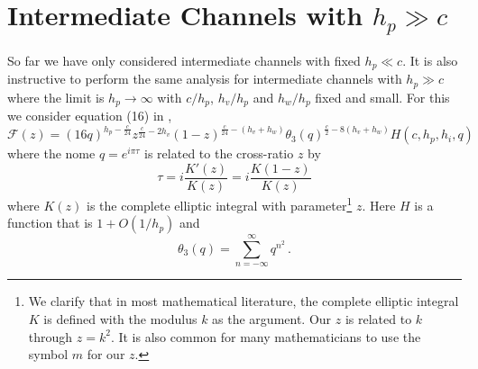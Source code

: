 \documentclass{brownthesis}
\begin{document}
\section{Intermediate Channels with $h_{p}\gg c$}

So far we have only considered intermediate channels with fixed $h_{p}\ll c$.
It is also instructive to perform the same analysis for intermediate
channels with $h_{p}\gg c$ where the limit is $h_{p}\to\infty$ with
$c/h_{p}$, $h_{v}/h_{p}$ and $h_{w}/h_{p}$ fixed and small. For
this we consider equation (16) in \cite{Zam87},
\begin{equation}
\mathcal{F}(z)=\left(16q\right)^{h_{p}-\frac{c}{24}}z^{\frac{c}{24}-2h_{v}}(1-z)^{\frac{c}{24}-(h_{v}+h_{w})}\theta_{3}(q)^{\frac{c}{2}-8(h_{v}+h_{w})}H(c,h_{p},h_{i},q)\label{eq:eq16zem87}
\end{equation}
where the nome $q=e^{i\pi\tau}$ is related to the cross-ratio $z$
by
\[
\tau=i\frac{K'(z)}{K(z)}=i\frac{K(1-z)}{K(z)}
\]
where $K(z)$ is the complete elliptic integral with parameter\footnote{We clarify that in most mathematical literature, the complete elliptic
integral $K$ is defined with the modulus $k$ as the argument. Our
$z$ is related to $k$ through $z=k^{2}$. It is also common for
many mathematicians to use the symbol $m$ for our $z$.} $z$. Here $H$ is a function that is $1+O(1/h_{p})$ and
\begin{equation}
\theta_{3}(q)=\sum_{n=-\infty}^{\infty}q^{n^{2}}\,.\label{eq:thetathree}
\end{equation}
\end{document}
